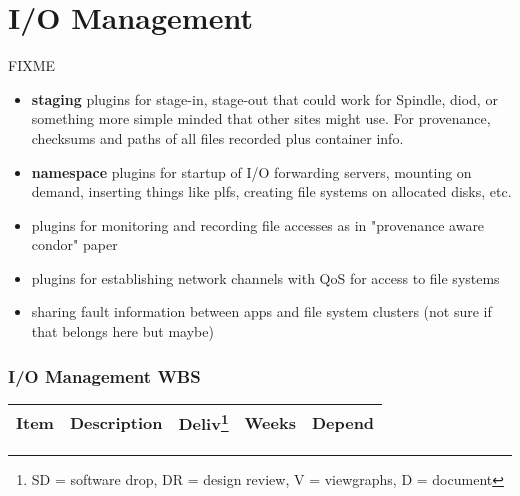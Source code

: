 \section{I/O Management}

FIXME

\begin{itemize}
\item{\textbf{staging} plugins for stage-in, stage-out that could work
for Spindle, diod, or something more simple minded that other sites might use.
For provenance, checksums and paths of all files recorded plus container info.}
\item{\textbf{namespace} plugins for startup of I/O forwarding servers,
mounting on demand, inserting things like plfs, creating file systems on
allocated disks, etc.}
\item{plugins for monitoring and recording file accesses as in "provenance
  aware condor" paper}
\item{plugins for establishing network channels with QoS for access to file
systems}
\item{sharing fault information between apps and file system clusters
  (not sure if that belongs here but maybe)}
\end{itemize}

\ifwbs
\subsubsection{I/O Management WBS}

\begin{longtable}{|p{1cm}|p{10.2cm}|p{1cm}|p{1cm}|p{1.8cm}|}\hline
  \textbf{Item} & \textbf{Description}
                & \textbf{Deliv}\footnote{SD = software drop,
                        DR = design review, V = viewgraphs, D = document}
                & \textbf{Weeks} & \textbf{Depend} \\
  \hline
\end{longtable}
\fi
